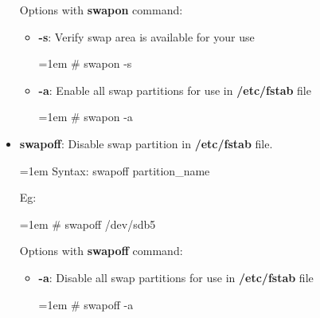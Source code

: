 \begin{flushleft}
\begin{itemize}
	Options with \textbf{swapon} command:
	\begin{itemize}
		\item 	\textbf{-s}: Verify swap area is available for your use
		\bigskip
		\begin{tcolorbox}[breakable,notitle,boxrule=-0pt,colback=black,colframe=black]
			\color{green}
			\font=1em
			\# swapon -s
			\font=4pt
		\end{tcolorbox}
		\item \textbf{-a}: Enable all swap partitions for use in \textbf{/etc/fstab} file
		\bigskip
		\begin{tcolorbox}[breakable,notitle,boxrule=-0pt,colback=black,colframe=black]
			\color{green}
			\font=1em
			\# swapon -a
			\font=4pt
		\end{tcolorbox}
		
	\end{itemize}

	
	\newpage
	\item \textbf{swapoff}: Disable swap partition in \textbf{/etc/fstab} file.
	\begin{tcolorbox}[breakable,notitle,boxrule=-0pt,colback=pink,colframe=pink]
		\color{black}
		\font=1em
		Syntax: swapoff partition\_name
		\font=4pt
	\end{tcolorbox}
	
	Eg:
	\begin{tcolorbox}[breakable,notitle,boxrule=-0pt,colback=black,colframe=black]
		\color{green}
		\font=1em
		\# swapoff /dev/sdb5
		\font=4pt
	\end{tcolorbox}
	
	Options with \textbf{swapoff} command:
	\begin{itemize}
		\item \textbf{-a}: Disable all swap partitions for use in \textbf{/etc/fstab} file
		\bigskip
		\begin{tcolorbox}[breakable,notitle,boxrule=-0pt,colback=black,colframe=black]
			\color{green}
			\font=1em
			\# swapoff -a
			\font=4pt
		\end{tcolorbox}
		
	\end{itemize}
	
\end{itemize}

	
\end{flushleft}

\newpage

